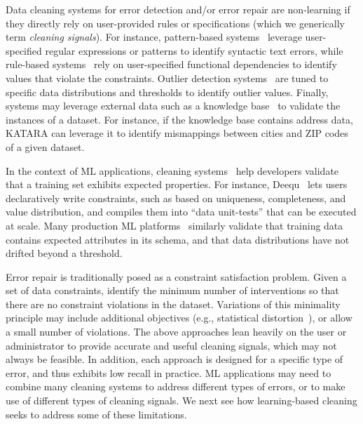 \documentclass[11pt,dvipsnames]{article}
\begin{document}
Data cleaning systems for error detection and/or error repair are non-learning if they directly rely on user-provided rules or specifications (which we generically term {\it cleaning signals}). 
For instance, pattern-based systems~\cite{OpenRefine,datawrangler} leverage user-specified regular expressions or patterns to identify syntactic text errors, 
while rule-based systems~\cite{NADEEF,ContinuousDataCleaning} rely on user-specified functional dependencies to identify values that violate the constraints.
Outlier detection systems~\cite{pit2016outlier,OutlierDetectionSurvey} are tuned to specific data distributions and thresholds to identify outlier values. 
Finally, systems may leverage external data such as a knowledge base~\cite{KATARA} to validate the instances of a dataset. 
For instance, if the knowledge base contains address data, KATARA can leverage it to identify mismappings between cities and ZIP codes of a given dataset.

In the context of ML applications, cleaning systems~\cite{Deequ,Tfx} help developers validate that a training set exhibits expected properties.  For instance, Deequ~\cite{Deequ} lets users declaratively write constraints, such as based on uniqueness, completeness, and value distribution, and compiles them into ``data unit-tests'' that can be executed at scale.   Many production ML platforms~\cite{Tfx,amazonvldb,Breck2019DataVF} similarly validate that training data contains expected attributes in its schema, and that data distributions have not drifted beyond a threshold.


Error repair is traditionally posed as a constraint satisfaction problem.  Given a set of data constraints, identify the minimum number of interventions so that there are no constraint violations in the dataset.  Variations of this minimality principle may include additional objectives (e.g., statistical distortion~\cite{StatisticalDistortion}), or allow a small number of violations.
The above approaches lean heavily on the user or administrator to provide accurate and useful cleaning signals, which may not always be feasible.   In addition, each approach is designed for a specific type of error, and thus exhibits low recall in practice.  ML applications may need to combine many cleaning systems to address different types of errors, or to make use of different types of cleaning signals.  We next see how learning-based cleaning seeks to address some of these limitations.
\end{document}
